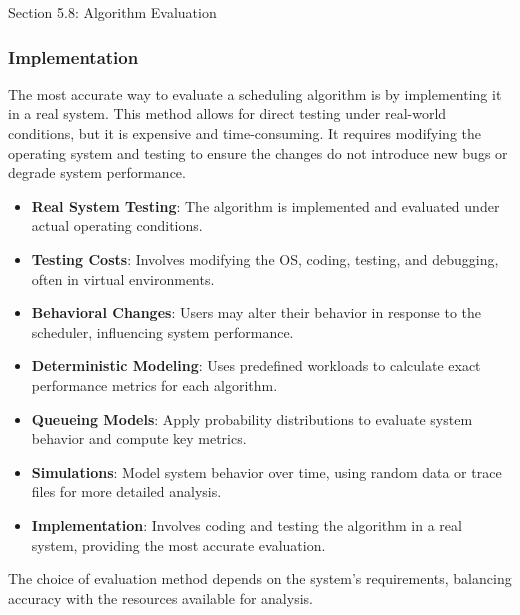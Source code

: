 \begin{notes}{Section 5.8: Algorithm Evaluation}
\begin{highlight}[Simulations]
    \end{highlight}
    
    \subsubsection*{Implementation}
    
    The most accurate way to evaluate a scheduling algorithm is by implementing it in a real system. This method allows for direct testing under real-world conditions, but it is expensive and time-consuming. 
    It requires modifying the operating system and testing to ensure the changes do not introduce new bugs or degrade system performance.
    
    \begin{highlight}[Implementation]
    
        \begin{itemize}
            \item \textbf{Real System Testing}: The algorithm is implemented and evaluated under actual operating conditions.
            \item \textbf{Testing Costs}: Involves modifying the OS, coding, testing, and debugging, often in virtual environments.
            \item \textbf{Behavioral Changes}: Users may alter their behavior in response to the scheduler, influencing system performance.
        \end{itemize}
    
    \end{highlight}
    
    \begin{highlight}
    
        \begin{itemize}
            \item \textbf{Deterministic Modeling}: Uses predefined workloads to calculate exact performance metrics for each algorithm.
            \item \textbf{Queueing Models}: Apply probability distributions to evaluate system behavior and compute key metrics.
            \item \textbf{Simulations}: Model system behavior over time, using random data or trace files for more detailed analysis.
            \item \textbf{Implementation}: Involves coding and testing the algorithm in a real system, providing the most accurate evaluation.
        \end{itemize}
    
    The choice of evaluation method depends on the system's requirements, balancing accuracy with the resources available for analysis.
    
    \end{highlight}
\end{notes}
